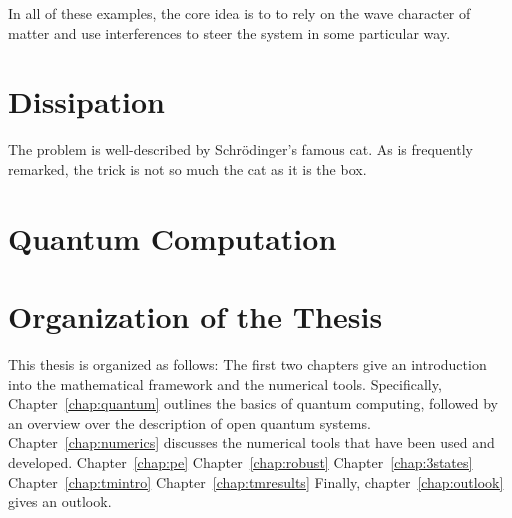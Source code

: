 In all of these examples, the core idea is to to rely on the wave character
of matter and use interferences to steer the system in some particular way.

\section{Dissipation}

The problem is well-described by Schrödinger's famous cat.
As is frequently remarked, the trick is not so much the cat as it is the box.

\section{Quantum Computation}

\section{Organization of the Thesis}

This thesis is organized as follows: The first two chapters give an introduction
into the mathematical framework and the numerical tools.
Specifically, Chapter~\ref{chap:quantum} outlines the basics of quantum
computing, followed by an overview over the description of open quantum systems.
Chapter~\ref{chap:numerics} discusses the numerical tools that have been used
and developed.
Chapter~\ref{chap:pe}
Chapter~\ref{chap:robust}
Chapter~\ref{chap:3states}
Chapter~\ref{chap:tmintro}
Chapter~\ref{chap:tmresults}
Finally, chapter~\ref{chap:outlook} gives an outlook.

